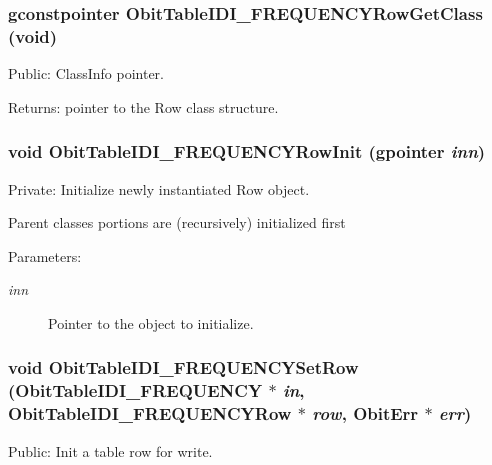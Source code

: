 \subsubsection{\setlength{\rightskip}{0pt plus 5cm}gconstpointer Obit\-Table\-IDI\_\-FREQUENCYRow\-Get\-Class (void)}\label{ObitTableIDI__FREQUENCY_8c_a15}


Public: Class\-Info pointer. 

\begin{Desc}
\item[Returns:]pointer to the Row class structure. \end{Desc}
\subsubsection{\setlength{\rightskip}{0pt plus 5cm}void Obit\-Table\-IDI\_\-FREQUENCYRow\-Init (gpointer {\em inn})}\label{ObitTableIDI__FREQUENCY_8c_a6}


Private: Initialize newly instantiated Row object. 

Parent classes portions are (recursively) initialized first \begin{Desc}
\item[Parameters:]
\begin{description}
\item[{\em inn}]Pointer to the object to initialize. \end{description}
\end{Desc}
\subsubsection{\setlength{\rightskip}{0pt plus 5cm}void Obit\-Table\-IDI\_\-FREQUENCYSet\-Row ({\bf Obit\-Table\-IDI\_\-FREQUENCY} $\ast$ {\em in}, {\bf Obit\-Table\-IDI\_\-FREQUENCYRow} $\ast$ {\em row}, {\bf Obit\-Err} $\ast$ {\em err})}\label{ObitTableIDI__FREQUENCY_8c_a23}


Public: Init a table row for write. 

